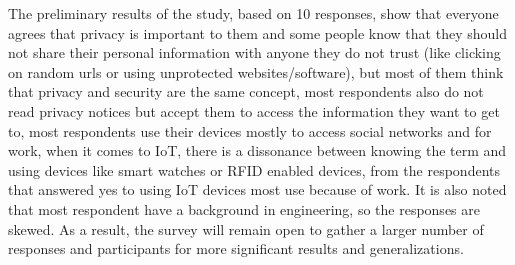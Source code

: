 The preliminary results of the study, based on 10 responses, show that everyone
agrees that privacy is important to them and some people know that they
should not share their personal information with anyone they do not trust
(like clicking on random urls or using unprotected websites/software), but
most of them think that privacy and security are the same concept, most
respondents also do not read privacy notices but accept them to access the
information they want to get to, most respondents use their devices mostly
to access social networks and for work, when it comes to IoT, there is a
dissonance between knowing the term and using devices like smart watches
or RFID enabled devices, from the respondents that answered yes to using
IoT devices most use because of work. It is also noted that most respondent
have a background in engineering, so the responses are skewed. As a result,
the survey will remain open to gather a larger number of responses and participants
for more significant results and generalizations.

